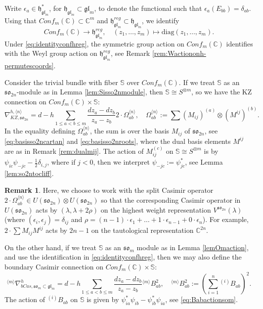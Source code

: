 \documentclass[10pt]{amsart}
\numberwithin{equation}{section}
\theoremstyle{definition}
\newtheorem{remark}[theorem]{Remark}
\def\C{{\mathbb C}}
\newcommand{\glm}{\mathfrak{gl}_{m}}
\newcommand{\son}[1][2n]{\mathfrak{so}_{#1}}
\newcommand{\ot}{\otimes}
\newcommand{\howespin}{\boldsymbol{\mathbb{S}}}
\begin{document}
Write $\epsilon_a\in \mathfrak{h}_{\glm}^*$, for $\mathfrak{h}_{\glm}\subset \glm$, to denote the functional such that $\epsilon_a(E_{bb})=\delta_{ab}$. Using that $Conf_m(\C) \subset \C^m$ and $\mathfrak{h}_{\glm}^{reg}\subset \mathfrak{h}_{\glm}$, we identify
\begin{equation}\label{eq:identityconfhreg}
Conf_m(\C)\rightarrow \mathfrak{h}_{\glm}^{reg}, \quad (z_1, \dots, z_m) \mapsto \mathrm{diag} (z_1, \dots, z_m).
\end{equation}
Under \eqref{eq:identityconfhreg}, the symmetric group action on $Conf_m(\C)$ identifies with the Weyl group action on $\mathfrak{h}_{\glm}^{reg}$, see Remark \ref{rem:Wactiononh-permutescoords}.

Consider the trivial bundle with fiber $\howespin$ over $Conf_m(\C)$. If we treat $\howespin$ as an $\son$-module as in Lemma \ref{lem:Sisso2nmodule}, then $\howespin\cong S^{\ot m}$, so we have the KZ connection on $Conf_m(\C)\times \howespin$:
\begin{equation}\label{KZ_so2n}
    \nabla_{KZ,\son}^{h,\langle n\rangle}= d-h\sum_{1\le a< b \le m} \frac{dz_a -dz_b}{z_a-z_b}2\cdot \Omega_{ab}^{\langle n \rangle}, \quad \Omega_{ab}^{\langle n \rangle}:=\sum (M_{ij})^{(a)}\ot (M^{ij})^{(b)}.
\end{equation}
In the equality defining $\Omega_{ab}^{\langle n\rangle}$, the sum is over the basis $M_{ij}$ of $\son$, see \eqref{eq:basisso2ncartan} and \eqref{eq:basisso2nroots}, where the dual basis elements $M^{ij}$ are as in Remark \ref{rem:dualmij}. The action of $M^{(c)}_{ij}$ on $\howespin\cong S^{\otimes m}$ is by $\psi_{ic}\psi_{-jc} - \frac{1}{2}\delta_{i,j}$, where  if $j<0$, then we interpret $\psi_{-jc}:=\psi_{jc}^*$, see Lemma \ref{lem:so2ntocliff}.

\begin{remark}
    Here, we choose to work with the split Casimir operator $2\cdot \Omega_{ab}^{\langle n\rangle}\in U(\son)\otimes U(\son)$ so that the corresponding Casimir operator in $U(\son)$ acts by $(\lambda,\lambda+2\rho)$ on the highest weight representation $V^{\son}(\lambda)$ (where $(\epsilon_i,\epsilon_j)=\delta_{ij}$ and $\rho=(n-1)\cdot\epsilon_1+\dots+1\cdot\epsilon_{n-1}+0\cdot \epsilon_n$). For example, $2\cdot\sum M_{ij} M^{ij}$ acts by $2n-1$ on the tautological representation $\C^{2n}$.
\end{remark}

On the other hand, if we treat $\howespin$ as an $\mathfrak{so}_m$ module as in Lemma \ref{lemOmaction}, and use the identification in \eqref{eq:identityconfhreg}, then we may also define the boundary Casimir connection on $Conf_m(\C)\times \howespin$:
\begin{equation}\label{bCas_extended_som}
    {}^{\langle m\rangle}\nabla_{bCas,\mathfrak{so}_m\subset \mathfrak{gl}_m}^{h}= d-h\sum_{1\le a< b \le m} \frac{dz_a-dz_b}{z_a-z_b}{}^{\langle m\rangle}B^2_{ab}, \quad {}^{\langle m\rangle}B^2_{ab}:=\left(\sum_{i=1}^n{}^{(i)}B_{ab}\right)^2.
\end{equation}
The action of ${}^{(i)}B_{ab}$ on $\howespin$ is given by $\psi_{ia}^*\psi_{ib}-\psi_{ib}^*\psi_{ia}$, see \eqref{eq:Babactionsom}.
\end{document}
